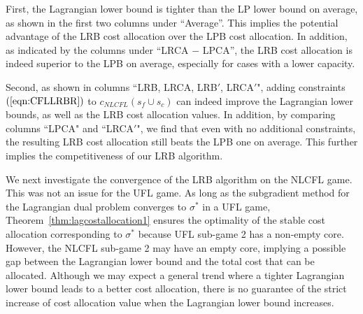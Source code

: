 \documentclass[ijoc,nonblindrev]{informs3} %
\begin{document}
First, the Lagrangian lower bound is tighter than the LP lower bound on average, as shown in the first two columns under ``Average''.
This implies the potential advantage of the LRB cost allocation over the LPB cost allocation.
In addition, as indicated by the columns under ``LRCA $-$ LPCA'', the LRB cost allocation is indeed superior to the LPB on average, especially for cases with a lower capacity.


Second, as shown in columns ``LRB, LRCA, LRB$'$, LRCA$'$", adding constraints $(\ref{eqn:CFLLRBR})$ to $c_{NLCFL}(s_f \cup s_c)$ can indeed improve the Lagrangian lower bounds, as well as the LRB cost allocation values. In addition, by comparing columns ``LPCA" and ``LRCA$'$", we find that even with no additional constraints, the resulting LRB cost allocation still beats the LPB one on average. This further implies the competitiveness of our LRB algorithm.






We next investigate the convergence of the LRB algorithm on the NLCFL game. 
This was not an issue for the UFL game.
As long as the subgradient method for the Lagrangian dual problem converges to $\sigma^*$ in a UFL game, Theorem~\ref{thm:lagcostallocation1} ensures the optimality of the stable cost allocation corresponding to $\sigma^*$ because UFL sub-game 2 has a non-empty core. 
However, the NLCFL sub-game 2 may have an empty core, implying a possible gap between the Lagrangian lower bound and the total cost that can be allocated.
Although we may expect a general trend where a tighter Lagrangian lower bound leads to a better cost allocation, there is no guarantee of the strict increase of cost allocation value when the Lagrangian lower bound increases.
\end{document}
